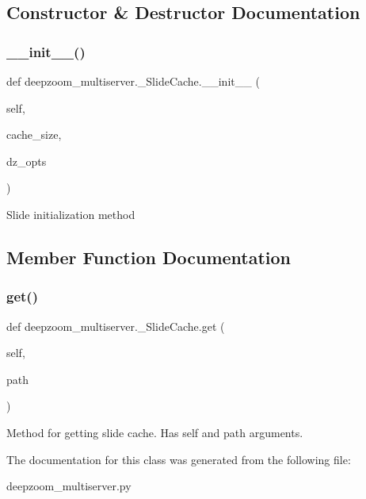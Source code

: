 \subsection{Constructor \& Destructor Documentation}
\mbox{\label{classdeepzoom__multiserver_1_1__SlideCache_aff4273bc9e83c44f06410582a494fd09}} 
\subsubsection{\texorpdfstring{\+\_\+\+\_\+init\+\_\+\+\_\+()}{\_\_init\_\_()}}
{\footnotesize\ttfamily def deepzoom\+\_\+multiserver.\+\_\+\+Slide\+Cache.\+\_\+\+\_\+init\+\_\+\+\_\+ (\begin{DoxyParamCaption}\item[{}]{self,  }\item[{}]{cache\+\_\+size,  }\item[{}]{dz\+\_\+opts }\end{DoxyParamCaption})}

\begin{DoxyVerb}Slide initialization method
\end{DoxyVerb}
 

\subsection{Member Function Documentation}
\mbox{\label{classdeepzoom__multiserver_1_1__SlideCache_a56ebc4b35c7ec1e9e39ee2e0c368cc56}} 
\subsubsection{\texorpdfstring{get()}{get()}}
{\footnotesize\ttfamily def deepzoom\+\_\+multiserver.\+\_\+\+Slide\+Cache.\+get (\begin{DoxyParamCaption}\item[{}]{self,  }\item[{}]{path }\end{DoxyParamCaption})}

\begin{DoxyVerb}Method for getting slide cache. Has self and path arguments.
\end{DoxyVerb}
 

The documentation for this class was generated from the following file\+:\begin{DoxyCompactItemize}
\item 
deepzoom\+\_\+multiserver.\+py\end{DoxyCompactItemize}
